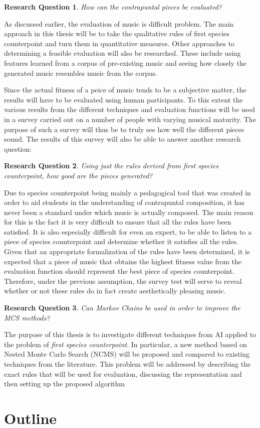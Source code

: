 \documentclass[master.tex]{subfiles} %
\newtheorem{researchquestion}{Research Question}
\begin{document}
\begin{researchquestion}
How can the contrapuntal pieces be evaluated?
\end{researchquestion}

As discussed earlier, the evaluation of music is difficult problem. The main approach in this thesis will be to take the qualitative rules of first species counterpoint and turn them in quantitative measures.  Other approaches to determining a feasible evaluation will also be researched. These include using features learned from a corpus of pre-existing music and seeing how closely the generated music resembles music from the corpus. 

Since the actual fitness of a peice of music tends to be a subjective matter, the results will have to be evaluated using human participants. To this extent the various results from the different techniques and evaluation functions will be used in a survey carried out on a number of people with varying musical maturity. The purpose of such a survey will thus be to truly see how well the different pieces sound. The results of this survey will also be able to answer another research question: 

\begin{researchquestion}
Using just the rules derived from first species counterpoint, how good are the pieces generated?
\end{researchquestion}

Due to species counterpoint being mainly a pedagogical tool that was created in order to aid students in the understanding of contrapuntal composition, it has never been a standard under which music is actually composed. The main reason for this is the fact it is very difficult to ensure that all the rules have been satisfied. It is also especially difficult for even an expert, to be able to listen to a piece of species counterpoint and determine whether it satisfies all the rules. Given that an appropriate formalization of the rules have been determined, it is expected that a piece of music that obtains the highest fitness value from the evaluation function should represent the best piece of species counterpoint. Therefore, under the previous assumption, the survey test will serve to reveal whether or not these rules do in fact create aesthetically pleasing music. 

\begin{researchquestion}
Can Markov Chains be used in order to improve the MCS methods?
\end{researchquestion}

The purpose of this thesis is to investigate different techniques from AI applied to the problem of \emph{first species counterpoint}. In particular, a new method based on Nested Monte Carlo Search (NCMS) will be proposed and compared to existing techniques from the literature. This problem will be addressed by describing the exact rules that will be used for evaluation, discussing the representation and then setting up the proposed algorithm 

\section{Outline}
\end{document}
